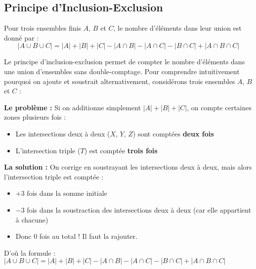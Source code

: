 \subsection{Principe d'Inclusion-Exclusion}

\begin{theorembox}
Pour trois ensembles finis $A$, $B$ et $C$, le nombre d'éléments dans leur union est donné par :
$$ |A \cup B \cup C| = |A| + |B| + |C| - |A \cap B| - |A \cap C| - |B \cap C| + |A \cap B \cap C| $$
\end{theorembox}

\begin{intuitionbox}
Le principe d'inclusion-exclusion permet de compter le nombre d'éléments dans une union d'ensembles sans double-comptage. Pour comprendre intuitivement pourquoi on ajoute et soustrait alternativement, considérons trois ensembles $A$, $B$ et $C$ :

\begin{center}
\end{center}

\textbf{Le problème :} Si on additionne simplement $|A| + |B| + |C|$, on compte certaines zones plusieurs fois :
\begin{itemize}
    \item Les intersections deux à deux ($X$, $Y$, $Z$) sont comptées \textbf{deux fois}
    \item L'intersection triple ($T$) est comptée \textbf{trois fois}
\end{itemize}

\textbf{La solution :} On corrige en soustrayant les intersections deux à deux, mais alors l'intersection triple est comptée :
\begin{itemize}
    \item $+3$ fois dans la somme initiale
    \item $-3$ fois dans la soustraction des intersections deux à deux (car elle appartient à chacune)
    \item Donc $0$ fois au total ! Il faut la rajouter.
\end{itemize}

D'où la formule : $|A \cup B \cup C| = |A| + |B| + |C| - |A \cap B| - |A \cap C| - |B \cap C| + |A \cap B \cap C|$
\end{intuitionbox}

